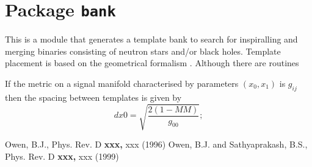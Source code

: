 \chapter{Package \texttt{bank}}

This is a module that generates a template bank to search for
inspiralling and merging binaries consisting of neutron stars
and/or black holes. Template placement is based on the geometrical
formalism \cite{owen:96,OwenAndSathyaprakash:99}.  Although
there are routines 

If the metric
on a signal manifold characterised by parameters $(x_0,x_1)$ is 
$g_{ij}$ then the spacing between templates is given by
\begin{equation}
   dx0 = \sqrt{ \frac{2(1 -MM)}{g_{00}} };
\end{equation}
 
\newpage
\begin{thebibliography}{}
Owen, B.J., Phys. Rev. D {\bf xxx,} xxx (1996) 
Owen, B.J. and Sathyaprakash, B.S., Phys. Rev. D {\bf xxx,} xxx (1999) 
\end{thebibliography}{}
